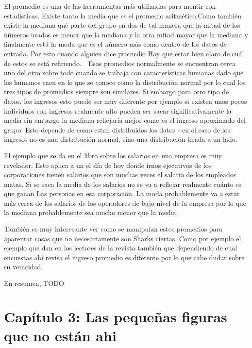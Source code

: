 \documentclass[letterpaper, 11pt]{article}
\begin{document}
El promedio es una de las herramientas más utilizadas para mentir con estadísticas. Existe tanto la media que es el promedio aritmético,Como también existe la mediana qué parte del grupo en dos de tal manera que la mitad de los números usados es menor que la mediana y la otra mitad mayor que la mediana y finalmente está la moda que es el número más como dentro de los datos de entrada. Por esto cuando alguien dice promedio Hay que estar bien claro de cuál de estos se está refiriendo.  Esos promedios normalmente se encuentran cerca uno del otro sobre todo cuando se trabaja con características humanas dado que los humanos caen en lo que se conoce como la distribución normal por lo cual los tres tipos de promedios siempre son similares. Si embargo para otro tipo de datos, los ingresos esto puede ser muy diferente por ejemplo si existen unos pocos individuos con ingresos realmente alto pueden ser sacar significativamente la media sin embargo la mediana reflejaría mejor como es el ingreso aproximado del grupo. Esto depende de como estan distribuidos los datos - en el caso de los ingresos no es una distribución normal, sino una distribución tirada a un lado.

El ejemplo que se da en el libro sobre los salarios en una empresa es muy revelador. Esto aplica a un el día de hoy donde irnos ejecutivos de los corporaciones tienen salarios que son muchas veces el salario de los empleados matas. Si se saca la media de los salarios no se va a reflejar realmente cuánto es que ganan Las personas en esa corporación. La moda probablemente va a estar más cerca de los salarios de los operadores de bajo nivel de la empresa por lo que la mediana probablemente sea mucho menor que la media.

También es muy interesante ver como se manipulan estos promedios para aparentar cosas que no necesariamente son Sharks ciertas. Como por ejemplo el ejemplo que dan en los lectores de la revista también que dependiendo de cual encuestas ahí revisa el ingreso promedio es diferente por lo que cabe dudar sobre su veracidad.

En resumen, TODO

\section*{Capítulo 3: Las pequeñas figuras que no están ahi}
\end{document}

